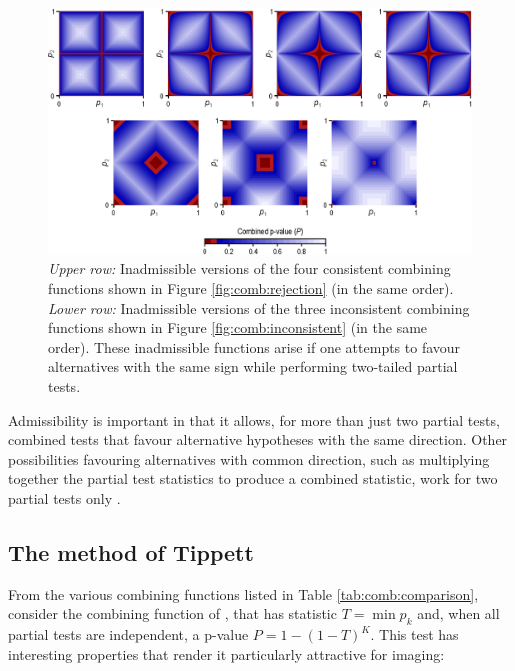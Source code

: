 \begin{figure}[!p]
\begin{center}
\centerline{\includegraphics[scale=.8]{images/inadmissible.eps}}
\end{center}
\caption[Examples of inadmissible combining functions.]{\emph{Upper row:} Inadmissible versions of the four consistent combining functions shown in Figure \ref{fig:comb:rejection} (in the same order). \emph{Lower row:} Inadmissible versions of the three inconsistent combining functions shown in Figure \ref{fig:comb:inconsistent} (in the same order). These inadmissible functions arise if one attempts to favour alternatives with the same sign while performing two-tailed partial tests.}
\label{fig:comb:inadmissible}
\end{figure}

Admissibility is important in that it allows, for more than just two partial tests, combined tests that favour alternative hypotheses with the same direction. Other possibilities favouring alternatives with common direction, such as multiplying together the partial test statistics to produce a combined statistic, work for two partial tests only \citep{Hayasaka2006}.

\subsection{The method of Tippett}

From the various combining functions listed in Table \ref{tab:comb:comparison}, consider the combining function of \citet{Tippett1931}, that has statistic $T = \min {p_{k}}$ and, when all partial tests are independent, a p-value $P = 1-(1-T)^K$. This test has interesting properties that render it particularly attractive for imaging:

